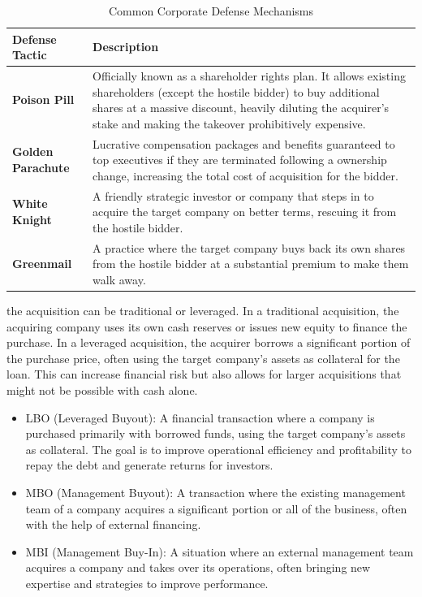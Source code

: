 \documentclass[12pt,a4paper]{report}
\begin{document}
\begin{table}[h]
\centering
\caption{Common Corporate Defense Mechanisms}
\label{tab:defenses}
\begin{tabular}{lp{9cm}}
\toprule
\textbf{Defense Tactic} & \textbf{Description} \\
\midrule
\textbf{Poison Pill} & Officially known as a shareholder rights plan. It allows existing shareholders (except the hostile bidder) to buy additional shares at a massive discount, heavily diluting the acquirer's stake and making the takeover prohibitively expensive. \\
\addlinespace
\textbf{Golden Parachute} & Lucrative compensation packages and benefits guaranteed to top executives if they are terminated following a ownership change, increasing the total cost of acquisition for the bidder. \\
\addlinespace
\textbf{White Knight} & A friendly strategic investor or company that steps in to acquire the target company on better terms, rescuing it from the hostile bidder. \\
\addlinespace
\textbf{Greenmail} & A practice where the target company buys back its own shares from the hostile bidder at a substantial premium to make them walk away. \\
\bottomrule
\end{tabular}
\end{table}

the acquisition can be traditional or leveraged. In a traditional acquisition, the acquiring company uses its own cash reserves or issues new equity to finance the purchase. In a leveraged acquisition, the acquirer borrows a significant portion of the purchase price, often using the target company's assets as collateral for the loan. This can increase financial risk but also allows for larger acquisitions that might not be possible with cash alone.
\begin{itemize}
    \item LBO (Leveraged Buyout): A financial transaction where a company is purchased primarily with borrowed funds, using the target company's assets as collateral. The goal is to improve operational efficiency and profitability to repay the debt and generate returns for investors.
    \item MBO (Management Buyout): A transaction where the existing management team of a company acquires a significant portion or all of the business, often with the help of external financing.
    \item MBI (Management Buy-In): A situation where an external management team acquires a company and takes over its operations, often bringing new expertise and strategies to improve performance.
\end{itemize}
\end{document}
